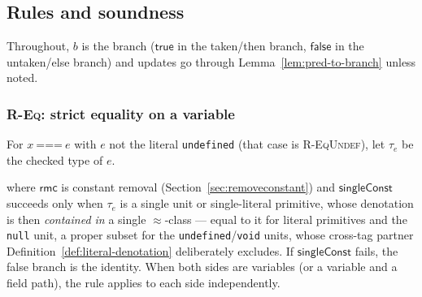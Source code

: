 \documentclass[11pt]{article}
\newcommand{\Env}{\Gamma}
\newcommand{\RefineT}[3]{#1 \vdash #2 \stackrel{\mathsf{t}}{\rightsquigarrow} #3}
\newcommand{\RefineF}[3]{#1 \vdash #2 \stackrel{\mathsf{f}}{\rightsquigarrow} #3}
\begin{document}
\subsection{Rules and soundness}

Throughout, $b$ is the branch ($\mathsf{true}$ in the taken/then branch,
$\mathsf{false}$ in the untaken/else branch) and updates go through
Lemma~\ref{lem:pred-to-branch} unless noted.

\subsubsection{\textsc{R-Eq}: strict equality on a variable}
\label{sec:r-eq}

For $x\ \texttt{===}\ e$ with $e$ not the literal \texttt{undefined}
(that case is \textsc{R-EqUndef}), let $\tau_e$ be the checked type of $e$.
where $\mathsf{rmc}$ is constant removal (Section~\ref{sec:removeconstant})
and $\mathsf{singleConst}$ succeeds only when $\tau_e$ is a single unit
or single-literal primitive, whose denotation is then \emph{contained in} a
single $\approx$-class — equal to it for literal primitives and the
\texttt{null} unit, a proper subset for the \texttt{undefined}/\texttt{void}
units, whose cross-tag partner
Definition~\ref{def:literal-denotation} deliberately excludes. If
$\mathsf{singleConst}$ fails, the false branch is the identity. When both
sides are variables (or a variable and a field path), the rule applies to
each side independently.
\end{document}
